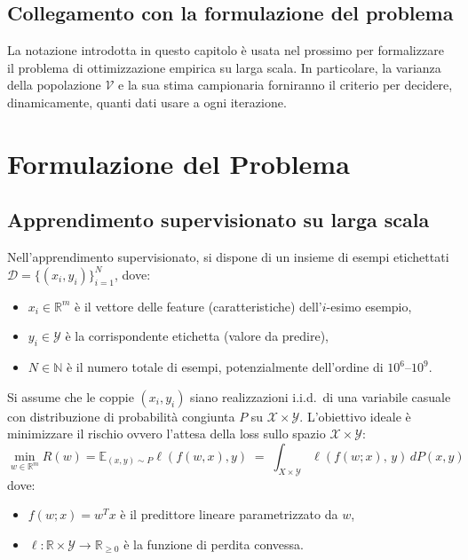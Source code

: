 \documentclass[a4paper,12pt]{article}
\numberwithin{equation}{section}
\numberwithin{figure}{section}
\numberwithin{table}{section}
\newcommand{\R}{\mathbb{R}}
\begin{document}
\subsection{Collegamento con la formulazione del problema}

La notazione introdotta in questo capitolo è usata nel prossimo per
formalizzare il problema di ottimizzazione empirica su larga scala. In
particolare, la varianza della popolazione $\mathcal{V}$ e la sua stima
campionaria forniranno il criterio per decidere, dinamicamente, quanti dati
usare a ogni iterazione.
\newpage

\section{Formulazione del Problema}\label{sec:formulazione}

\subsection{Apprendimento supervisionato su larga scala}

Nell'apprendimento supervisionato, si dispone di un insieme di esempi etichettati $\mathcal{D} = \{(x_i, y_i)\}_{i=1}^N$, dove:
\begin{itemize}
    \item $x_i \in \R^m$ \`e il vettore delle feature (caratteristiche) dell'$i$-esimo esempio,
    \item $y_i \in \mathcal{Y}$ \`e la corrispondente etichetta (valore da predire),
    \item $N \in \mathbb{N}$ \`e il numero totale di esempi, potenzialmente dell'ordine di $10^6$--$10^9$.
\end{itemize}

Si assume che le coppie $(x_i, y_i)$ siano realizzazioni i.i.d.\ di una variabile casuale con distribuzione di probabilit\`a congiunta $P$ su $\mathcal{X} \times \mathcal{Y}$. L'obiettivo ideale \`e minimizzare il rischio ovvero l'attesa della loss sullo spazio $\mathcal{X}\times\mathcal{Y}$:
\[
  \min_{w \in \R^m}{R}(w)=\mathbb{E}_{(x,y)\sim P}\ell(f(w,x),y) \;=\; \int_{{X} \times \mathcal{Y}} \ell\!\left(f(w;x),\, y\right) \, dP(x,y)
\]
dove:
\begin{itemize}
    \item $f(w;x) = w^T x$ \`e il predittore lineare parametrizzato da $w$,
    \item $\ell: \R \times \mathcal{Y} \to \R_{\geq 0}$ \`e la funzione di perdita convessa.
\end{itemize}
\end{document}
